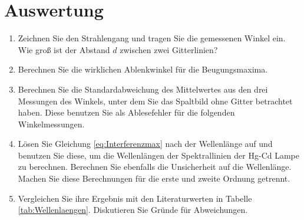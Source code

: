 \section{Auswertung} 
\begin{enumerate}
	\item Zeichnen Sie den Strahlengang und tragen Sie die gemessenen Winkel ein. Wie groß ist der Abstand $d$ zwischen zwei Gitterlinien?
	\item Berechnen Sie die wirklichen Ablenkwinkel für die Beugungsmaxima.
	\item Berechnen Sie die Standardabweichung des Mittelwertes aus den drei Messungen des Winkels, unter dem Sie das Spaltbild ohne Gitter betrachtet haben. Diese benutzen Sie als Ablesefehler für die folgenden Winkelmessungen.
	\item Lösen Sie Gleichung \ref{eq:Interferenzmax} nach der Wellenlänge auf und benutzen Sie diese, um die Wellenlängen der Spektrallinien der Hg-Cd Lampe zu berechnen. Berechnen Sie ebenfalls die Unsicherheit auf die Wellenlänge. Machen Sie diese Berechnungen für die erste und zweite Ordnung getrennt.
	\item Vergleichen Sie ihre Ergebnis mit den Literaturwerten in Tabelle \ref{tab:Wellenlaengen}. Diskutieren Sie Gründe für Abweichungen.
\end{enumerate}

